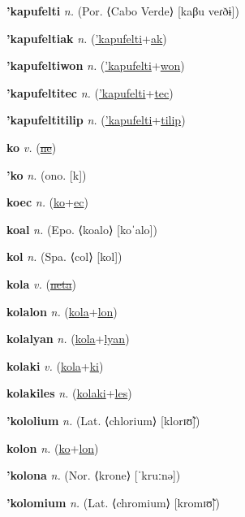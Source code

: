 \textbf{\hypertarget{'kapufelti}{'kapufelti}} \textit{n.} (Por. ⟨Cabo Verde⟩ [kaβu veɾðɨ])


\textbf{\hypertarget{'kapufeltiak}{'kapufeltiak}} \textit{n.} (\hyperlink{'kapufelti}{'kapufelti}+\allowbreak \hyperlink{ak}{ak})


\textbf{\hypertarget{'kapufeltiwon}{'kapufeltiwon}} \textit{n.} (\hyperlink{'kapufelti}{'kapufelti}+\allowbreak \hyperlink{won}{won})


\textbf{\hypertarget{'kapufeltitec}{'kapufeltitec}} \textit{n.} (\hyperlink{'kapufelti}{'kapufelti}+\allowbreak \hyperlink{tec}{tec})


\textbf{\hypertarget{'kapufeltitilip}{'kapufeltitilip}} \textit{n.} (\hyperlink{'kapufelti}{'kapufelti}+\allowbreak \hyperlink{tilip}{tilip})


\textbf{\hypertarget{ko}{ko}} \textit{v.} (\hyperlink{ne}{\sout{ne}})


\textbf{\hypertarget{'ko}{'ko}} \textit{n.} (ono. [k])


\textbf{\hypertarget{koec}{koec}} \textit{n.} (\hyperlink{ko}{ko}+\allowbreak \hyperlink{ec}{ec})


\textbf{\hypertarget{koal}{koal}} \textit{n.} (Epo. ⟨koalo⟩ [koˈalo])


\textbf{\hypertarget{kol}{kol}} \textit{n.} (Spa. ⟨col⟩ [kol])


\textbf{\hypertarget{kola}{kola}} \textit{v.} (\hyperlink{neta}{\sout{neta}})


\textbf{\hypertarget{kolalon}{kolalon}} \textit{n.} (\hyperlink{kola}{kola}+\allowbreak \hyperlink{lon}{lon})


\textbf{\hypertarget{kolalyan}{kolalyan}} \textit{n.} (\hyperlink{kola}{kola}+\allowbreak \hyperlink{lyan}{lyan})


\textbf{\hypertarget{kolaki}{kolaki}} \textit{v.} (\hyperlink{kola}{kola}+\allowbreak \hyperlink{ki}{ki})


\textbf{\hypertarget{kolakiles}{kolakiles}} \textit{n.} (\hyperlink{kolaki}{kolaki}+\allowbreak \hyperlink{les}{les})


\textbf{\hypertarget{'kololium}{'kololium}} \textit{n.} (Lat. ⟨chlorium⟩ [klorɪʊ̃])


\textbf{\hypertarget{kolon}{kolon}} \textit{n.} (\hyperlink{ko}{ko}+\allowbreak \hyperlink{lon}{lon})


\textbf{\hypertarget{'kolona}{'kolona}} \textit{n.} (Nor. ⟨krone⟩ [ˈkruːnə])


\textbf{\hypertarget{'kolomium}{'kolomium}} \textit{n.} (Lat. ⟨chromium⟩ [kromɪʊ̃])


